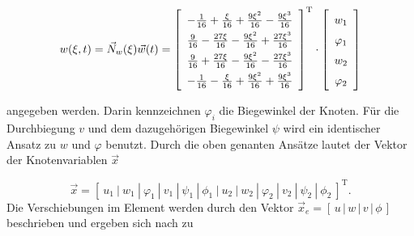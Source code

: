 	\begin{equation}\label{equ:Kubik-Ansatz-Algebra}
	\renewcommand\arraystretch{1.5}
	w(\xi,t) = 
	\vec{N}_{w}(\xi) \vec{w}(t)
	=
	\left[ 
	\begin{array}{c}
	-\frac{1}{16}+\frac{\xi}{16}+\frac{9\xi^{2}}{16}-\frac{9\xi^{3}}{16}\\
	\frac{9}{16}-\frac{27\xi}{16}-\frac{9\xi^{2}}{16}+\frac{27\xi^{3}}{16}\\
	\frac{9}{16}+\frac{27\xi}{16}-\frac{9\xi^{2}}{16}-\frac{27\xi^{3}}{16}\\
	-\frac{1}{16}-\frac{\xi}{16}+\frac{9\xi^{2}}{16}+\frac{9\xi^{3}}{16}
	\end{array}
	\right]^{\mathrm{T}} \cdot
	\left[ 
	\begin{array}{c}
	w_{1}\\
	\varphi_{1}\\
	w_{2}\\
	\varphi_{2}
	\end{array}
	\right]	
	\end{equation}
	
	angegeben werden. Darin kennzeichnen $\varphi_{i}$ die Biegewinkel der Knoten. Für die Durchbiegung $ v $ und dem dazugehörigen Biegewinkel $ \psi $ wird ein identischer Ansatz zu $w$ und $\varphi$ benutzt. Durch die oben genanten Ansätze lautet der Vektor der Knotenvariablen $ \vec{x} $
	
	\begin{equation}\label{equ:Knotenverformung-P}
	\vec{x} = \left[ \left. \ u_{1} \ \right|  \  w_{1} \ \left| \  \varphi_{1} \ \right| \  v_{1} \ \left| \ \psi_{1} \ \right| \ \phi_{1} \ \left| \  u_{2} \ \right| \ w_{2} \ \left| \ \varphi_{2} \ \right|  \  v_{2} \ \left| \  \psi_{2} \ \right| \  \phi_{2} \   \right]^{\mathrm{T}} .
	\end{equation}
	Die Verschiebungen im Element werden durch den Vektor $ \vec{x}_{e}=[ \,u \, | \, w \, | \, v \, | \, \phi \, ] $ beschrieben und ergeben sich nach \cite{steinke2015finite} zu
	

